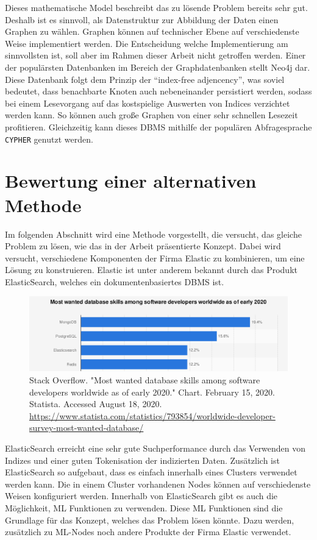 \documentclass[
	12pt,
	BCOR=5mm,
	DIV=12,
	headinclude=on,
	footinclude=off,
	parskip=half,
	bibliography=totoc,
	listof=entryprefix,
	toc=listof,
	numbers=noenddot,
	plainfootsepline
]{scrreprt}
\begin{document}
Dieses mathematische Model beschreibt das zu lösende Problem bereits sehr gut. Deshalb ist es sinnvoll, als Datenstruktur zur Abbildung der Daten einen Graphen zu wählen. Graphen können auf technischer Ebene auf verschiedenste Weise implementiert werden. Die Entscheidung welche Implementierung am sinnvollsten ist, soll aber im Rahmen dieser Arbeit nicht getroffen werden. Einer der populärsten Datenbanken im Bereich der Graphdatenbanken stellt Neo4j dar. Diese Datenbank folgt dem Prinzip der \enquote{index-free adjencency}, was soviel bedeutet, dass benachbarte Knoten auch nebeneinander persistiert werden, sodass bei einem Lesevorgang auf das kostspielige Auswerten von Indices verzichtet werden kann. So können auch große Graphen von einer sehr schnellen Lesezeit profitieren. Gleichzeitig kann dieses \ac{DBMS} mithilfe der populären Abfragesprache \texttt{CYPHER} genutzt werden.

\section{Bewertung einer alternativen Methode}

Im folgenden Abschnitt wird eine Methode vorgestellt, die versucht, das gleiche Problem zu lösen, wie das in der Arbeit präsentierte Konzept. Dabei wird versucht, verschiedene Komponenten der Firma Elastic zu kombinieren, um eine Lösung zu konstruieren. Elastic ist unter anderem bekannt durch das Produkt ElasticSearch, welches ein dokumentenbasiertes \ac{DBMS} ist.

\begin{figure}[h]
	\centering
	\includegraphics[width=1.0\linewidth]{img/statista_db.png}
	\caption{Stack Overflow. "Most wanted database skills among software developers worldwide as of early 2020." Chart. February 15, 2020. Statista. Accessed August 18, 2020. \url{https://www.statista.com/statistics/793854/worldwide-developer-survey-most-wanted-database/}}
\end{figure}

ElasticSearch erreicht eine sehr gute Suchperformance durch das Verwenden von Indizes und einer guten Tokenisation der indizierten Daten. Zusätzlich ist ElasticSearch so aufgebaut, dass es einfach innerhalb eines Clusters verwendet werden kann. Die in einem Cluster vorhandenen Nodes können auf verschiedenste Weisen konfiguriert werden. Innerhalb von ElasticSearch gibt es auch die Möglichkeit, \ac{ML} Funktionen zu verwenden. Diese \ac{ML} Funktionen sind die Grundlage für das Konzept, welches das Problem lösen könnte. Dazu werden, zusätzlich zu \ac{ML}-Nodes noch andere Produkte der Firma Elastic verwendet.
\end{document}
